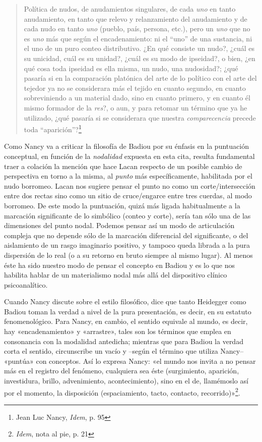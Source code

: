 \begin{quote}
Política de nudos, de anudamientos singulares, de cada \emph{uno} en tanto anudamiento, en tanto que relevo y relanzamiento del anudamiento y de cada nudo en tanto \emph{uno} (pueblo, país, persona, etc.), pero un \emph{uno} que no es \emph{uno} más que según el encadenamiento: ni el ``uno'' de una sustancia, ni el uno de un puro conteo distributivo. ¿En qué consiste un nudo?, ¿cuál es su unicidad, cuál es su unidad?, ¿cuál es su modo de ipseidad?, o bien, ¿en qué cosa toda ipseidad es ella misma, un nudo, una nudosidad?; ¿qué pasaría si en la comparación platónica del arte de lo político con el arte del tejedor ya no se considerara más el tejido en cuanto segundo, en cuanto sobreviniendo a un material dado, sino en cuanto primero, y en cuanto él mismo formador de la \emph{res}?, o aun, y para retomar un término que ya he utilizado, ¿qué pasaría si se considerara que nuestra \emph{comparecencia} precede toda ``aparición''?\footnote{Jean Luc Nancy, \emph{Idem}, p. 95}
\end{quote}

Como Nancy va a criticar la filosofía de Badiou por su énfasis en la puntuación conceptual, en función de la \emph{nodalidad} expuesta en esta cita, resulta fundamental traer a colación la mención que hace Lacan respecto de un posible cambio de perspectiva en torno a la misma, al \emph{punto} más específicamente, habilitada por el nudo borromeo. Lacan nos sugiere pensar el punto no como un corte/intersección entre dos rectas sino como un sitio de cruce/engarce entre tres cuerdas, al modo borromeo. De este modo la puntuación, quizá más ligada habitualmente a la marcación significante de lo simbólico (conteo y corte), sería tan sólo una de las dimensiones del punto nodal. Podemos pensar así un modo de articulación compleja que no depende sólo de la marcación diferencial del significante, o del aislamiento de un rasgo imaginario positivo, y tampoco queda librada a la pura dispersión de lo real (o a su retorno en bruto siempre al mismo lugar). Al menos éste ha sido nuestro modo de pensar el concepto en Badiou y es lo que nos habilita hablar de un materialismo nodal más allá del dispositivo clínico psicoanalítico.

Cuando Nancy discute sobre el estilo filosófico, dice que tanto Heidegger como Badiou toman la verdad a nivel de la pura presentación, es decir, en su estatuto fenomenológico. Para Nancy, en cambio, el sentido equivale al mundo, es decir, hay «encadenamiento» y «arrastre», tales son los términos que emplea en consonancia con la modalidad antedicha; mientras que para Badiou la verdad corta el sentido, circunscribe un vacío y --según el término que utiliza Nancy-- «puntúa» con conceptos. Así lo expresa Nancy: «el mundo nos invita a no pensar más en el registro del fenómeno, cualquiera sea éste (surgimiento, aparición, investidura, brillo, advenimiento, acontecimiento), sino en el de, llamémoslo así por el momento, la disposición (espaciamiento, tacto, contacto, recorrido)»\footnote{\emph{Idem}, nota al pie, p. 21}.

